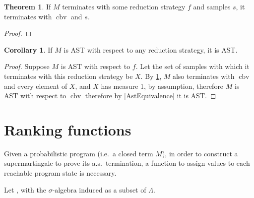 \documentclass{article}
\DeclareMathOperator{\cbv}{cbv}
\theoremstyle{definition}
\theoremstyle{lemma}
\newtheorem{theorem}{Theorem}
\newtheorem{corollary}{Corollary}
\theoremstyle{remark}
\begin{document}
\begin{theorem} \label{CbvIsTerminatingest}
If $M$ terminates with some reduction strategy $f$ and samples $s$, it terminates with $\cbv$ and $s$.
\end{theorem}
\begin{proof}
\end{proof}

\begin{corollary}
If $M$ is AST with respect to any reduction strategy, it is AST.
\end{corollary}
\begin{proof}
Suppose $M$ is AST with respect to $f$. Let the set of samples with which it terminates with this reduction strategy be $X$. By \ref{CbvIsTerminatingest}, $M$ also terminates with $\cbv$ and every element of $X$, and $X$ has measure 1, by assumption, therefore $M$ is AST with respect to $\cbv$ therefore by \ref{AstEquivalence} it is AST.
\end{proof}



\section{Ranking functions}
Given a probabilistic program (i.e.~a closed term $M$), in order to construct a supermartingale to prove its a.s.~termination, a function to assign values to each reachable program state is necessary. 

Let %
,
with the $\sigma$-algebra induced as a subset of $\Lambda$. 
\end{document}
